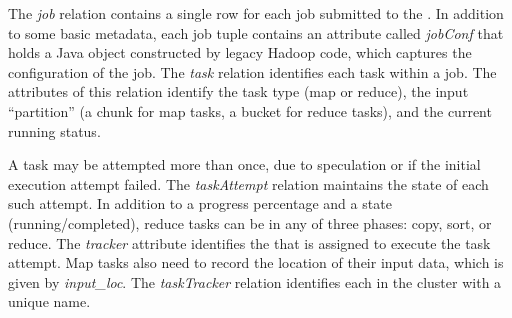 The \emph{job} relation contains a single row for each job submitted to the
{\JT}. In addition to some basic metadata, each job tuple contains an attribute
called \emph{jobConf} that holds a Java object constructed by legacy Hadoop
code, which captures the configuration of the job. The \emph{task} relation
identifies each task within a job. The attributes of this relation identify the
task type (map or reduce), the input ``partition'' (a chunk for map tasks, a
bucket for reduce tasks), and the current running status.

A task may be attempted more than once, due to speculation or if the initial
execution attempt failed.  The \emph{taskAttempt} relation maintains the state
of each such attempt.  In addition to a progress percentage and a state
(running/completed), reduce tasks can be in any of three phases: copy, sort, or
reduce. The \emph{tracker} attribute identifies the {\TT} that is assigned to
execute the task attempt. Map tasks also need to record the location of their
input data, which is given by \emph{input\_loc}. The \emph{taskTracker} relation
identifies each {\TT} in the cluster with a unique name.




